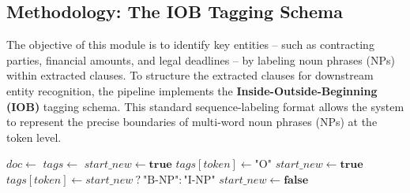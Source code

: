 \documentclass[twoside,final]{hcmut-report}
\begin{document}
\subsection{Methodology: The IOB Tagging Schema}
The objective of this module is to identify key entities -- such as contracting parties, financial amounts, and legal deadlines -- by labeling noun phrases (NPs) within extracted clauses. To structure the extracted clauses for downstream entity recognition, the pipeline implements the \textbf{Inside-Outside-Beginning (IOB)} tagging schema. This standard sequence-labeling format allows the system to represent the precise boundaries of multi-word noun phrases (NPs) at the token level.
\begin{algorithm}[H]
  \footnotesize
  \caption{IOB Noun Phrase Chunking with Boundary Reset}
  \begin{algorithmic}[1]
    \State $doc \gets$ 
    \State $tags \gets$ 
    \State $start\_new \gets \textbf{true}$
     
    \State $tags[token] \gets \text{"O"}$
    \State $start\_new \gets \textbf{true}$ 
    \Else
    \State $tags[token] \gets start\_new \ ? \ \text{"B-NP"} : \text{"I-NP"}$
    \State $start\_new \gets \textbf{false}$
    \EndIf
    \EndFor
    \EndFor

    \State \Return {}
    \EndProcedure
  \end{algorithmic}
\end{algorithm}
\end{document}
